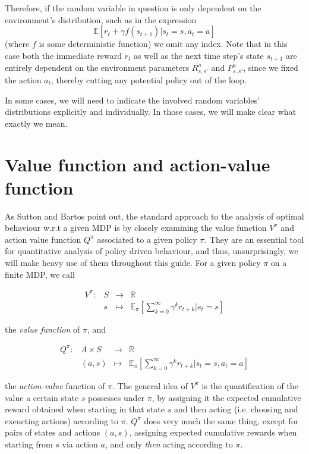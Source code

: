 \documentclass[11pt]{article} %
\begin{document}
Therefore, if the random variable in question is only dependent on the environment's distribution, such as in the expression $$\mathbb{E}[r_t + \gamma f(s_{t+1}) | s_t = s, a_t = a]$$ (where $f$ is some deterministic function) we omit any index. Note that in this case both the immediate reward $r_t$ as well as the next time step's state $s_{t+1}$ are entirely dependent on the environment parameters $R^a_{s,s'}$ and $P^a_{s,s'}$, since we fixed the action $a_t$, thereby cutting any potential policy out of the loop.

In some cases, we will need to indicate the involved random variables' distributions explicitly and individually. In those cases, we will make clear what exactly we mean.

\section{Value function and action-value function}

As Sutton and Bartos point out, the standard approach to the analysis of optimal behaviour w.r.t a given MDP is by closely examining the value function $V^{\pi}$ and action value function $Q^{\pi}$ associated to a given policy $\pi$. They are an essential tool for quantitative analysis of policy driven behaviour, and thus, unsurprisingly, we will make heavy use of them throughout this guide. For a given policy $\pi$ on a finite MDP, we call

\[
	\begin{array}{llll}
		V^{\pi} :	& S 	& \to 	& \mathbb{R} \\
				& s	& \mapsto	& \mathbb{E}_{\pi}[\sum_{k=0}^{\infty} \gamma^k r_{t+k} | s_t = s]
	\end{array}
\]

the \textit{value function} of $\pi$, and 

\[
	\begin{array}{llll}
		Q^{\pi} : 	& A \times S 	& \to 	& \mathbb{R} \\
				& (a,s)		& \mapsto	& \mathbb{E}_{\pi}[\sum_{k=0}^{\infty} \gamma^k r_{t+k} | s_t = s, a_t = a]
	\end{array}
\]

the \textit{action-value} function of $\pi$. The general idea of $V^{\pi}$ is the quantification of the value a certain state $s$ possesses under $\pi$, by assigning it the expected cumulative reward obtained when starting in that state $s$ and then acting (i.e. choosing and exeucting actions) according to $\pi$. $Q^{\pi}$ does very much the same thing, except for pairs of states and actions $(a,s)$, assigning expected cumulative rewards when starting from $s$ via action $a$, and only \textit{then} acting according to $\pi$.
\end{document}
